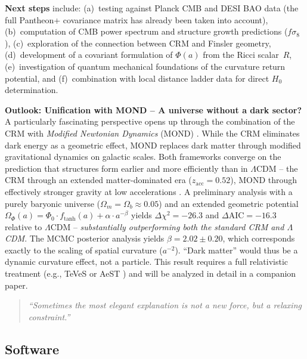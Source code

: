 \documentclass[aps,prd,twocolumn,superscriptaddress,nofootinbib]{revtex4-2}
\begin{document}
\textbf{Next steps} include: (a)~testing against Planck CMB and DESI BAO data (the full Pantheon+ covariance matrix has already been taken into account), (b)~computation of CMB power spectrum and structure growth predictions ($f\sigma_8$), (c)~exploration of the connection between CRM and Finsler geometry, (d)~development of a covariant formulation of $\Phi(a)$ from the Ricci scalar~$R$, (e)~investigation of quantum mechanical foundations of the curvature return potential, and (f)~combination with local distance ladder data for direct $H_0$ determination.

\textbf{Outlook: Unification with MOND -- A universe without a dark sector?} A particularly fascinating perspective opens up through the combination of the CRM with \textit{Modified Newtonian Dynamics} (MOND) \cite{Milgrom1983}. While the CRM eliminates dark energy as a geometric effect, MOND replaces dark matter through modified gravitational dynamics on galactic scales. Both frameworks converge on the prediction that structures form earlier and more efficiently than in $\Lambda$CDM -- the CRM through an extended matter-dominated era ($z_{\mathrm{acc}} = 0.52$), MOND through effectively stronger gravity at low accelerations \cite{Asencio2023}. A preliminary analysis with a purely baryonic universe ($\Omega_m = \Omega_b \approx 0.05$) and an extended geometric potential $\Omega_\Phi(a) = \Phi_0 \cdot f_{\mathrm{tanh}}(a) + \alpha \cdot a^{-\beta}$ yields $\Delta\chi^2 = -26.3$ and $\Delta\mathrm{AIC} = -16.3$ relative to $\Lambda$CDM -- \textit{substantially outperforming both the standard CRM and $\Lambda$CDM}. The MCMC posterior analysis yields $\beta = 2.02 \pm 0.20$, which corresponds exactly to the scaling of spatial curvature ($a^{-2}$). ``Dark matter'' would thus be a dynamic curvature effect, not a particle. This result requires a full relativistic treatment (e.g., TeVeS or AeST \cite{Bekenstein2004,Skordis2021}) and will be analyzed in detail in a companion paper.

\begin{quote}
\textit{``Sometimes the most elegant explanation is not a new force, but a relaxing constraint.''}
\end{quote}

\subsection*{Software}
\end{document}
